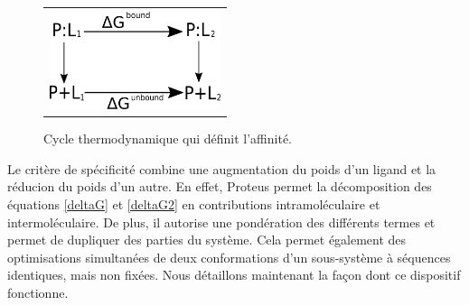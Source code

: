    \begin{figure}[!htbp]
     \centering
     \begin{tabular}{c}
       \includegraphics[width=5cm]{figure/cycleThermoLigand.png} &
     \end{tabular}
     
     \caption{Cycle thermodynamique qui définit l'affinité.}
\label{fig:cycleThermoLigand}
   \end{figure}
Le critère de spécificité combine une augmentation du poids d'un ligand et la réducion du poids d'un autre. En effet, Proteus permet la décomposition des équations \ref{deltaG} et \ref{deltaG2} en contributions intramoléculaire et intermoléculaire. De plus, il autorise une pondération des différents termes et permet de dupliquer des parties du système. Cela permet également des optimisations simultanées de deux conformations d'un sous-système à séquences identiques, mais non fixées. Nous détaillons maintenant la façon dont ce dispositif fonctionne.

